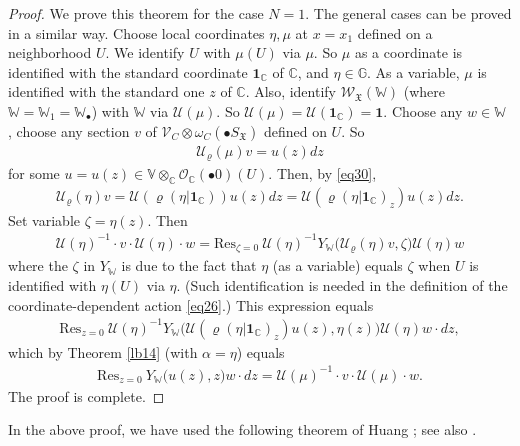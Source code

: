 \documentclass[12pt,a4paper,notitlepage]{article}
\theoremstyle{definition}
\theoremstyle{plain}
\newcommand{\fk}{\mathfrak}
\newcommand{\mc}{\mathcal}
\newcommand{\id}{\mathbf{1}}
\newcommand{\Res}{\mathrm{Res}}
\newcommand{\scr}{\mathscr}
\newcommand{\blt}{\bullet}
\newcommand{\Vbb}{\mathbb V}
\newcommand{\Wbb}{\mathbb W}
\newcommand{\Gbb}{\mathbb G}
\newcommand{\Cbb}{\mathbb C}
\numberwithin{equation}{section}
\begin{document}
\begin{proof}
We prove this theorem for the case $N=1$. The general cases can be proved in a similar way. Choose local coordinates $\eta,\mu$ at $x=x_1$ defined on a neighborhood $U$. We identify $U$ with $\mu(U)$ via $\mu$. So $\mu$ as a coordinate  is identified with the standard coordinate $\id_\Cbb$ of $\Cbb$, and $\eta\in\Gbb$. As a variable, $\mu$ is identified with the standard one $z$ of $\Cbb$. Also, identify $\scr W_{\fk X}(\Wbb)$ (where $\Wbb=\Wbb_1=\Wbb_\blt$) with $\Wbb$ via $\mc U(\mu)$. So $\mc U(\mu)=\mc U(\id_\Cbb)=\id$.  Choose any $w\in\Wbb$ , choose any section $v$ of $\scr V_C\otimes\omega_C(\blt S_{\fk X})$ defined on $U$. So
\begin{gather*}
\mc U_\varrho(\mu)v=u(z)dz
\end{gather*}
for some  $u=u(z)\in\Vbb\otimes_\Cbb\scr O_\Cbb(\blt 0)(U)$. Then, by \eqref{eq30},
	\begin{gather*}
	\mc U_\varrho(\eta)v=\mc U(\varrho(\eta|\id_\Cbb))u(z)dz=\mc U(\varrho(\eta|\id_\Cbb)_z)u(z)dz.
	\end{gather*}
Set variable $\zeta=\eta(z)$. Then
\begin{align*}
\mc U(\eta)^{-1}\cdot v\cdot\mc U(\eta)\cdot w=\Res_{\zeta=0}~\mc U(\eta)^{-1}Y_\Wbb\big(\mc U_\varrho(\eta)v,\zeta\big)\mc U(\eta)w
\end{align*}
where the $\zeta$ in $Y_\Wbb$ is due to the fact that $\eta$ (as a variable) equals $\zeta$ when $U$ is identified with $\eta(U)$ via $\eta$. (Such identification is needed in the definition of the coordinate-dependent action \eqref{eq26}.)  This expression equals
\begin{align*}
\Res_{z=0}~\mc U(\eta)^{-1}Y_\Wbb\big(\mc U(\varrho(\eta|\id_\Cbb)_z)u(z),\eta(z)\big)\mc U(\eta)w\cdot dz,
\end{align*}
which by Theorem \ref{lb14} (with $\alpha=\eta$) equals
	\begin{align*}
\Res_{z=0}~Y_\Wbb\big( u(z),z\big)w\cdot dz=\mc U(\mu)^{-1}\cdot v\cdot\mc U(\mu)\cdot w.
	\end{align*}
	The proof is complete.
\end{proof}



In the above proof, we have used the following theorem of Huang \cite{Hua97}; see also \cite[Lemma 6.5.6]{FB04}.
\end{document}
